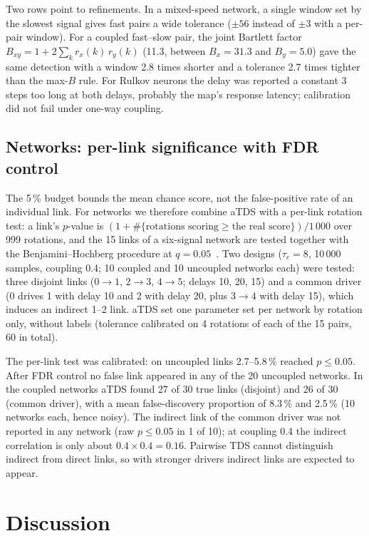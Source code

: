 \documentclass[11pt,a4paper]{article}
\begin{document}
Two rows point to refinements. In a mixed-speed network, a single window set by the slowest signal gives fast pairs a wide tolerance ($\pm56$ instead of $\pm3$ with a per-pair window). For a coupled fast--slow pair, the joint Bartlett factor $B_{xy} = 1 + 2\sum_k r_x(k)\, r_y(k)$ (11.3, between $B_x = 31.3$ and $B_y = 5.0$) gave the same detection with a window 2.8 times shorter and a tolerance 2.7 times tighter than the max-$B$ rule. For Rulkov neurons the delay was reported a constant 3 steps too long at both delays, probably the map's response latency; calibration did not fail under one-way coupling.

\subsection{Networks: per-link significance with FDR control}
\label{sec:res-network}
The 5\,\% budget bounds the mean chance score, not the false-positive rate of an individual link. For networks we therefore combine aTDS with a per-link rotation test: a link's $p$-value is $(1 + \#\{\text{rotations scoring} \ge \text{the real score}\}) / 1\,000$ over 999 rotations, and the 15 links of a six-signal network are tested together with the Benjamini--Hochberg procedure at $q = 0.05$~\cite{benjamini1995controlling}. Two designs ($\tau_c = 8$, 10\,000 samples, coupling 0.4; 10 coupled and 10 uncoupled networks each) were tested: three disjoint links ($0\to1$, $2\to3$, $4\to5$; delays 10, 20, 15) and a common driver (0 drives 1 with delay 10 and 2 with delay 20, plus $3\to4$ with delay 15), which induces an indirect 1--2 link. aTDS set one parameter set per network by rotation only, without labels (tolerance calibrated on 4 rotations of each of the 15 pairs, 60 in total).

The per-link test was calibrated: on uncoupled links 2.7--5.8\,\% reached $p \le 0.05$. After FDR control no false link appeared in any of the 20 uncoupled networks. In the coupled networks aTDS found 27 of 30 true links (disjoint) and 26 of 30 (common driver), with a mean false-discovery proportion of 8.3\,\% and 2.5\,\% (10 networks each, hence noisy). The indirect link of the common driver was not reported in any network (raw $p \le 0.05$ in 1 of 10); at coupling 0.4 the indirect correlation is only about $0.4 \times 0.4 = 0.16$. Pairwise TDS cannot distinguish indirect from direct links, so with stronger drivers indirect links are expected to appear.

\section{Discussion}
\label{sec:discussion}
\end{document}
